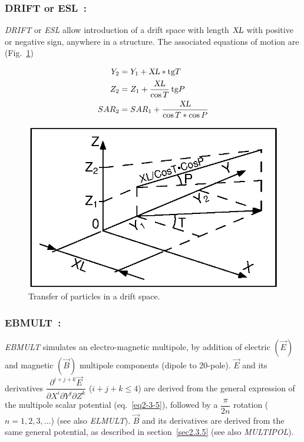 \newpage
\subsubsection*{DRIFT or ESL~: \DRIFTTitl}\label{ESL}\label{DRIFT}
\medskip

\textsl{DRIFT} or \textsl{ESL} allow introduction of a drift space with length $ \textsl{XL} $ with 
positive or negative sign, anywhere in a structure.  The associated equations 
of motion are (Fig.~\ref{fig23})   

\begin{align*}
	Y_2 &   =    Y_1+\textsl{XL} \ast \text{tg} T  \\ 
	Z_2 &   =   Z_1 + \dfrac{\textsl{XL}}{\cos  T}\,  \text{tg} P  \\
	SAR_2 &   =  SAR_1+ \dfrac{\textsl{XL} }{\cos  T  \ast \cos  P}  
\end{align*}
\vfill

\begin{figure}[H]
\centerline{\includegraphics[width=15cm]{Fig23.ps}}
\caption{\label{fig23}Transfer of particles in a drift space.}
\end{figure}
\vfill

\newpage
\subsubsection*{EBMULT~: \EBMULTTitl}\label{EBMULT} 
\medskip

\noindent\textsl{EBMULT} simulates an electro-magnetic multipole, by addition of
electric $ (\vec  E) $ and magnetic $ (\vec  B) $ multipole components (dipole to 20-pole). 
$\vec  E $ and its derivatives 
$ \dfrac{\partial^{ i+j+k} \vec  E }{ \partial X^i\partial Y^j\partial Z^k} $ 
($i+j+k \le 4$) are derived 
from the general expression of the multipole scalar potential (eq.~\ref{eq2-3-5}), followed by a 
$ \dfrac{\pi }{2n} $ rotation  ($n= 1, 2, 3, ...$)  (see also \textsl{ELMULT}). $ \vec  B $ and its
derivatives are derived from the same general potential, as described in section~\ref{sec2.3.5} 
(see also \textsl{MULTIPOL}). 


